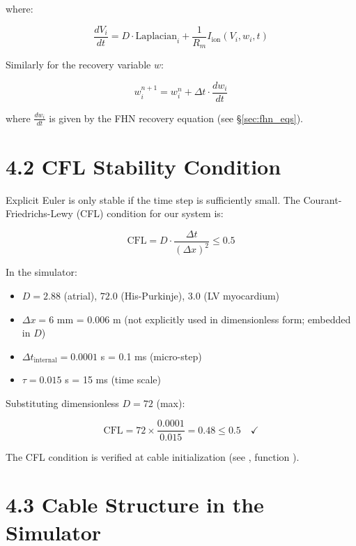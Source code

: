 where:

\begin{equation}
\frac{dV_i}{dt} = D \cdot \text{Laplacian}_i + \frac{1}{R_m} I_{\text{ion}}(V_i, w_i, t)
\end{equation}

Similarly for the recovery variable $w$:

\begin{equation}
w_i^{n+1} = w_i^n + \Delta t \cdot \frac{dw_i}{dt}
\end{equation}

where $\frac{dw_i}{dt}$ is given by the FHN recovery equation (see \S\ref{sec:fhn_eqs}).

\section{4.2 CFL Stability Condition}

Explicit Euler is only stable if the time step is sufficiently small. The Courant-Friedrichs-Lewy (CFL) condition for our system is:

\begin{equation}
\text{CFL} = D \cdot \frac{\Delta t}{(\Delta x)^2} \leq 0.5
\label{eq:cfl_condition}
\end{equation}

In the simulator:

\begin{itemize}
  \item $D = 2.88$ (atrial), $72.0$ (His-Purkinje), $3.0$ (LV myocardium)
  \item $\Delta x = 6$ mm = $0.006$ m (not explicitly used in dimensionless form; embedded in $D$)
  \item $\Delta t_{\text{internal}} = 0.0001$ s = 0.1 ms (micro-step)
  \item $\tau = 0.015$ s = 15 ms (time scale)
\end{itemize}

Substituting dimensionless $D = 72$ (max):

\begin{equation}
\text{CFL} = 72 \times \frac{0.0001}{0.015} = 0.48 \leq 0.5 \quad \checkmark
\end{equation}

The CFL condition is verified at cable initialization (see , function ).

\section{4.3 Cable Structure in the Simulator}

